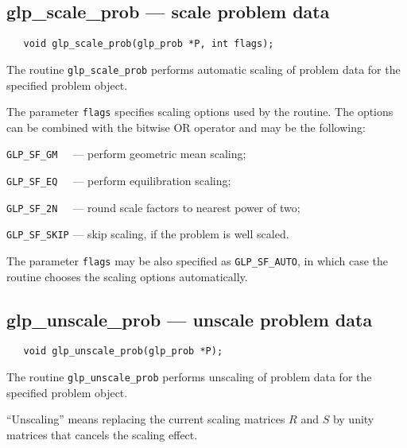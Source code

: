 \vspace*{-6pt}

\subsection{glp\_scale\_prob --- scale problem data}

\vspace*{-4pt}

\synopsis

\begin{verbatim}
   void glp_scale_prob(glp_prob *P, int flags);
\end{verbatim}

\description

The routine \verb|glp_scale_prob| performs automatic scaling of problem
data for the specified problem object.

The parameter \verb|flags| specifies scaling options used by the
routine. The options can be combined with the bitwise OR operator and
may be the following:

\verb|GLP_SF_GM  | --- perform geometric mean scaling;

\verb|GLP_SF_EQ  | --- perform equilibration scaling;

\verb|GLP_SF_2N  | --- round scale factors to nearest power of two;

\verb|GLP_SF_SKIP| --- skip scaling, if the problem is well scaled.

The parameter \verb|flags| may be also specified as \verb|GLP_SF_AUTO|,
in which case the routine chooses the scaling options automatically.

\vspace*{-6pt}

\subsection{glp\_unscale\_prob --- unscale problem data}

\vspace*{-4pt}

\synopsis

\begin{verbatim}
   void glp_unscale_prob(glp_prob *P);
\end{verbatim}

The routine \verb|glp_unscale_prob| performs unscaling of problem data
for the specified problem object.

``Unscaling'' means replacing the current scaling matrices $R$ and $S$
by unity matrices that cancels the scaling effect.

